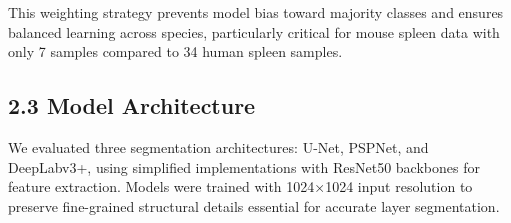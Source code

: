 \documentclass[11pt]{article}
\begin{document}
This weighting strategy prevents model bias toward majority classes and ensures balanced learning across species, particularly critical for mouse spleen data with only 7 samples compared to 34 human spleen samples.

\subsection*{2.3 Model Architecture}
\noindent
We evaluated three segmentation architectures: U-Net, PSPNet, and DeepLabv3+, using simplified implementations with ResNet50 backbones for feature extraction. Models were trained with 1024×1024 input resolution to preserve fine-grained structural details essential for accurate layer segmentation.



\end{document}
